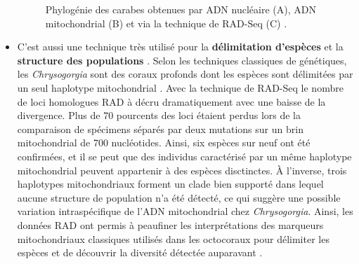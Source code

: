 \documentclass[a4paper,11pt,twoside]{report}
\begin{document}
\begin{itemize}
\begin{figure}[!ht]
\caption{Phylogénie des carabes obtenues par ADN nucléaire (A), ADN mitochondrial (B) et via la technique de RAD-Seq (C)\citep{cruaud2014empirical} \label{4}.}
\end{figure}

\item C'est aussi une technique très utilisé pour la \textbf{délimitation d'espèces} \citep{herrera2015rad}\citep{Pante2015aa} et la \textbf{structure des populations} \citep{Pante2015aa}. Selon les techniques classiques de génétiques, les \textit{Chrysogorgia} sont des coraux profonds dont les espèces sont délimitées par un seul haplotype mitochondrial \citep{herrera2015rad}\citep{Pante2015aa}. Avec la technique de RAD-Seq le nombre de loci homologues RAD à décru dramatiquement  avec une baisse de la divergence. Plus de 70 pourcents des loci étaient perdus lors de la comparaison de spécimens séparés par deux mutations sur un brin mitochondrial de 700 nucléotides. Ainsi, six espèces sur neuf ont été confirmées, et il se peut que des individus caractérisé par un même haplotype mitochondrial peuvent appartenir à des espèces disctinctes. À l'inverse, trois haplotypes mitochondriaux forment un clade bien supporté dans lequel aucune structure de population n'a été détecté, ce qui suggère une possible variation intraspécifique de l'ADN mitochondrial chez \textit{Chrysogorgia}. Ainsi, les données RAD ont permis à peaufiner les interprétations des marqueurs mitochondriaux classiques utilisés dans les octocoraux pour délimiter les espèces et de découvrir la diversité détectée auparavant \citep{Pante2015aa}.

\end{itemize}
\end{document}
